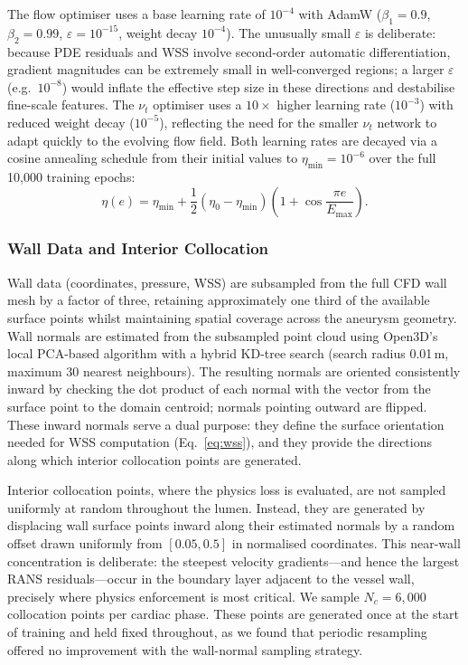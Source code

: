 \documentclass[11pt,a4paper]{article}
\begin{document}
The flow optimiser uses a base learning rate of $10^{-4}$ with AdamW ($\beta_1 = 0.9$, $\beta_2 = 0.99$, $\varepsilon = 10^{-15}$, weight decay $10^{-4}$). The unusually small $\varepsilon$ is deliberate: because PDE residuals and WSS involve second-order automatic differentiation, gradient magnitudes can be extremely small in well-converged regions; a larger $\varepsilon$ (e.g.\ $10^{-8}$) would inflate the effective step size in these directions and destabilise fine-scale features. The $\nu_t$ optimiser uses a $10\times$ higher learning rate ($10^{-3}$) with reduced weight decay ($10^{-5}$), reflecting the need for the smaller $\nu_t$ network to adapt quickly to the evolving flow field. Both learning rates are decayed via a cosine annealing schedule from their initial values to $\eta_{\min} = 10^{-6}$ over the full 10{,}000 training epochs:
\begin{equation}
\eta(e) = \eta_{\min} + \frac{1}{2}(\eta_0 - \eta_{\min})\left(1 + \cos\frac{\pi e}{E_{\max}}\right).
\label{eq:cosine}
\end{equation}

\subsubsection{Wall Data and Interior Collocation}

Wall data (coordinates, pressure, WSS) are subsampled from the full CFD wall mesh by a factor of three, retaining approximately one third of the available surface points whilst maintaining spatial coverage across the aneurysm geometry. Wall normals are estimated from the subsampled point cloud using Open3D's local PCA-based algorithm with a hybrid KD-tree search (search radius 0.01\,m, maximum 30 nearest neighbours). The resulting normals are oriented consistently inward by checking the dot product of each normal with the vector from the surface point to the domain centroid; normals pointing outward are flipped. These inward normals serve a dual purpose: they define the surface orientation needed for WSS computation (Eq.~\ref{eq:wss}), and they provide the directions along which interior collocation points are generated.

Interior collocation points, where the physics loss is evaluated, are not sampled uniformly at random throughout the lumen. Instead, they are generated by displacing wall surface points inward along their estimated normals by a random offset drawn uniformly from $[0.05, 0.5]$ in normalised coordinates. This near-wall concentration is deliberate: the steepest velocity gradients---and hence the largest RANS residuals---occur in the boundary layer adjacent to the vessel wall, precisely where physics enforcement is most critical. We sample $N_c = 6{,}000$ collocation points per cardiac phase. These points are generated once at the start of training and held fixed throughout, as we found that periodic resampling offered no improvement with the wall-normal sampling strategy.
\end{document}
